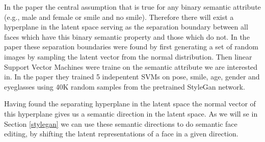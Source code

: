 In the paper the central assumption that is true for any binary semantic attribute (e.g., male  and female or smile and no smile).\cite{interfacegan} Therefore there will exist a hyperplane in the latent space serving as the separation boundary between all faces which have this binary semantic property and those which do not.
In the paper these separation boundaries were found by first generating a set of random images by sampling the latent vector from the normal distribution. Then linear Support Vector Machines were traine on the semantic attribute we are interested in. In the paper they trained 5 indepentent SVMs on pose, smile, age, gender and eyeglasses using 40K random samples from the pretrained StyleGan network.

Having found the separating hyperplane in the latent space the normal vector of this hyperplane gives us a semantic direction in the latent space. As we will se in Section \ref{stylegan} we can use these semantic directions to do semantic face editing, by shifting the latent representations of a face in a given direction.









%
%



%
%
%
